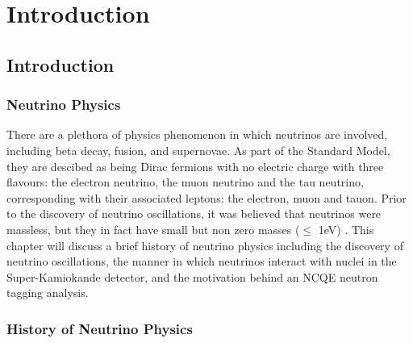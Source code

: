 \chapter{Introduction}
\label{chp:intro}

\section{Introduction}

\subsection{Neutrino Physics}

There are a plethora of physics phenomenon in which neutrinos are involved, including beta decay, fusion, and supernovae. As part of the Standard Model, they are descibed as being Dirac fermions with no electric charge with three flavours: the electron neutrino, the muon neutrino and the tau neutrino, corresponding with their associated leptons: the electron, muon and tauon. Prior to the discovery of neutrino oscillations, it was believed that neutrinos were massless, but they in fact have small but non zero masses ($\le$ 1eV) \cite{Aker_2019}. This chapter will discuss a brief history of neutrino physics including the discovery of neutrino oscillations, the manner in which neutrinos interact with nuclei in the Super-Kamiokande detector, and the motivation behind an NCQE neutron tagging analysis.

\subsection{History of Neutrino Physics}

